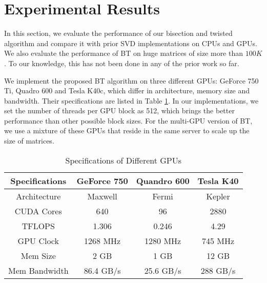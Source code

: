 \section{Experimental Results}
\label{sec:results}
In this section, we evaluate the performance of our bisection and twisted algorithm and compare it with prior SVD implementations on CPUs and GPUs.
We also evaluate the performance of BT on huge matrices of size more than $100K$. 
To our knowledge, this has not been done in any of the prior work so far. 

We implement the proposed BT algorithm on three different GPUs: GeForce 750 Ti, Quadro 600 and Tesla K40c,
which differ in architecture, memory size and bandwidth.
Their specifications are listed in Table \ref{tab:spec}. 
In our implementations, we set the number of threads per GPU block as 512, which brings the better performance than other possible block sizes.
For the multi-GPU version of BT, we use a mixture of these GPUs that reside in the same server to scale up the size of matrices. 
\begin{table}[h]
\vspace{-0.2in}
\caption{Specifications of Different GPUs}
\vspace{-0.1in}
\centering
\begin{tabular}{|c|c|c|c|}
\hline
Specifications & GeForce 750 & Quandro 600 & Tesla K40 \\ \hline
Architecture   &     Maxwell &       Fermi &    Kepler \\ \hline
CUDA Cores     &         640 &          96 &      2880 \\ \hline
TFLOPS         &       1.306 &       0.246 &      4.29 \\ \hline
GPU Clock      &    1268 MHz &    1280 MHz &   745 MHz \\ \hline
Mem Size       &        2 GB &        1 GB &     12 GB \\ \hline
Mem Bandwidth  &   86.4 GB/s &   25.6 GB/s &  288 GB/s \\ \hline
\end{tabular}
\label{tab:spec}
\vspace{-0.5in}
\end{table}


